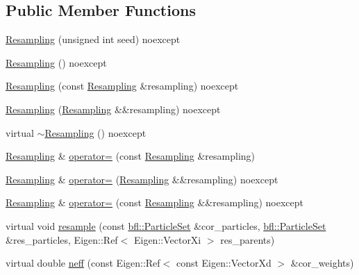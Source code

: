\subsection*{Public Member Functions}
\begin{DoxyCompactItemize}
\item 
\mbox{\hyperlink{classbfl_1_1Resampling_a22472d13211e8384eb56e0a16cbef63c}{Resampling}} (unsigned int seed) noexcept
\item 
\mbox{\hyperlink{classbfl_1_1Resampling_a817b9424651d6e54c5237feed607d530}{Resampling}} () noexcept
\item 
\mbox{\hyperlink{classbfl_1_1Resampling_ab8b3061b26141dc7630fa2481e63c27b}{Resampling}} (const \mbox{\hyperlink{classbfl_1_1Resampling}{Resampling}} \&resampling) noexcept
\item 
\mbox{\hyperlink{classbfl_1_1Resampling_af49062fae532a36662703905ad1cffca}{Resampling}} (\mbox{\hyperlink{classbfl_1_1Resampling}{Resampling}} \&\&resampling) noexcept
\item 
virtual \mbox{\hyperlink{classbfl_1_1Resampling_a2a11fe3c1ae79137d6bf4bc6a5171083}{$\sim$\+Resampling}} () noexcept
\item 
\mbox{\hyperlink{classbfl_1_1Resampling}{Resampling}} \& \mbox{\hyperlink{classbfl_1_1Resampling_a139238a96264afe71858445d8f2c137a}{operator=}} (const \mbox{\hyperlink{classbfl_1_1Resampling}{Resampling}} \&resampling)
\item 
\mbox{\hyperlink{classbfl_1_1Resampling}{Resampling}} \& \mbox{\hyperlink{classbfl_1_1Resampling_a2c90a9a0705770bad5761a04fefe6eaa}{operator=}} (\mbox{\hyperlink{classbfl_1_1Resampling}{Resampling}} \&\&resampling) noexcept
\item 
\mbox{\hyperlink{classbfl_1_1Resampling}{Resampling}} \& \mbox{\hyperlink{classbfl_1_1Resampling_a2120e8c5d26276cd3432ac23a2ada859}{operator=}} (const \mbox{\hyperlink{classbfl_1_1Resampling}{Resampling}} \&\&resampling) noexcept
\item 
virtual void \mbox{\hyperlink{classbfl_1_1Resampling_a7527025ad8afc6dbae2225213571391c}{resample}} (const \mbox{\hyperlink{classbfl_1_1ParticleSet}{bfl\+::\+Particle\+Set}} \&cor\+\_\+particles, \mbox{\hyperlink{classbfl_1_1ParticleSet}{bfl\+::\+Particle\+Set}} \&res\+\_\+particles, Eigen\+::\+Ref$<$ Eigen\+::\+Vector\+Xi $>$ res\+\_\+parents)
\item 
virtual double \mbox{\hyperlink{classbfl_1_1Resampling_af1fbc21ffc2fb10f14b79210de57d614}{neff}} (const Eigen\+::\+Ref$<$ const Eigen\+::\+Vector\+Xd $>$ \&cor\+\_\+weights)
\end{DoxyCompactItemize}
